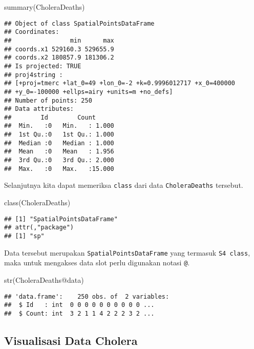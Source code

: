 \documentclass[
]{book}
\newenvironment{Shaded}{\begin{snugshade}}{\end{snugshade}}
\newcommand{\FunctionTok}[1]{\textcolor[rgb]{0.00,0.00,0.00}{#1}}
\newcommand{\NormalTok}[1]{#1}
\newcommand{\SpecialCharTok}[1]{\textcolor[rgb]{0.00,0.00,0.00}{#1}}
\begin{document}
\begin{Shaded}
\begin{Highlighting}[]
\FunctionTok{summary}\NormalTok{(CholeraDeaths)}
\end{Highlighting}
\end{Shaded}

\begin{verbatim}
## Object of class SpatialPointsDataFrame
## Coordinates:
##                min      max
## coords.x1 529160.3 529655.9
## coords.x2 180857.9 181306.2
## Is projected: TRUE 
## proj4string :
## [+proj=tmerc +lat_0=49 +lon_0=-2 +k=0.9996012717 +x_0=400000
## +y_0=-100000 +ellps=airy +units=m +no_defs]
## Number of points: 250
## Data attributes:
##        Id        Count       
##  Min.   :0   Min.   : 1.000  
##  1st Qu.:0   1st Qu.: 1.000  
##  Median :0   Median : 1.000  
##  Mean   :0   Mean   : 1.956  
##  3rd Qu.:0   3rd Qu.: 2.000  
##  Max.   :0   Max.   :15.000
\end{verbatim}

Selanjutnya kita dapat memeriksa \texttt{class} dari data \texttt{CholeraDeaths} tersebut.

\begin{Shaded}
\begin{Highlighting}[]
\FunctionTok{class}\NormalTok{(CholeraDeaths)}
\end{Highlighting}
\end{Shaded}

\begin{verbatim}
## [1] "SpatialPointsDataFrame"
## attr(,"package")
## [1] "sp"
\end{verbatim}

Data tersebut merupakan \texttt{SpatialPointsDataFrame} yang termasuk \texttt{S4\ class}, maka untuk mengakses data slot perlu digunakan notasi \texttt{@}.

\begin{Shaded}
\begin{Highlighting}[]
\FunctionTok{str}\NormalTok{(CholeraDeaths}\SpecialCharTok{@}\NormalTok{data)}
\end{Highlighting}
\end{Shaded}

\begin{verbatim}
## 'data.frame':    250 obs. of  2 variables:
##  $ Id   : int  0 0 0 0 0 0 0 0 0 0 ...
##  $ Count: int  3 2 1 1 4 2 2 2 3 2 ...
\end{verbatim}

\hypertarget{visualisasi-data-cholera}{%
\subsection{Visualisasi Data Cholera}\label{visualisasi-data-cholera}}
\end{document}
